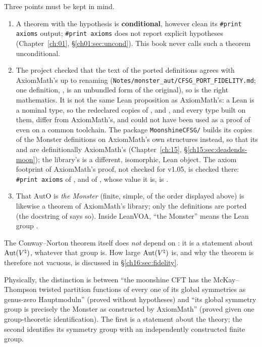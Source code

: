 Three points must be kept in mind.
\begin{enumerate}[label=(\alph*)]
\item A theorem with the hypothesis  is \textbf{conditional}, however clean its
  \texttt{\#print axioms} output; \texttt{\#print axioms} does not report explicit hypotheses
  (Chapter~\ref{ch:01}, \S\ref{ch01:sec:uncond}).  This book never calls such a theorem unconditional.
\item The project checked that the text of the ported definitions agrees with AxiomMath's up to renaming
  (\texttt{Notes/monster\_aut/CFSG\_PORT\_FIDELITY.md}; one definition, , is an unbundled
  form of the original), so  is the right mathematics.  It is not the same Lean proposition as
  AxiomMath's: a Lean  is a nominal type, so the redeclared copies of ,  and
  , and every type built on them, differ from AxiomMath's, and  could not have
  been used as a proof of  even on a common toolchain.  The package \texttt{MoonshineCFSG/} builds its
  copies of the Monster definitions on AxiomMath's own structures instead, so that its  and
   are definitionally AxiomMath's (Chapter~\ref{ch:15}, \S\ref{ch15:sec:deadends-moon}); the
  library's  is a different, isomorphic, Lean object.  The axiom footprint of AxiomMath's proof, not
  checked for v1.05, is checked there: \texttt{\#print axioms} of , and of ,
  whose value it is, is .
\item That $\mathrm{AutO}$ is \emph{the Monster} (finite, simple, of the order displayed above) is likewise a
  theorem of AxiomMath's library; only the definitions are ported (the docstring of
   says so).  Inside LeanVOA, ``the Monster'' means the Lean group
  .
\end{enumerate}
The Conway--Norton theorem  itself does \emph{not} depend on : it is a statement
about $\operatorname{Aut}({V^{\natural}})$, whatever that group is.  How large $\operatorname{Aut}({V^{\natural}})$ is, and why the theorem is therefore not
vacuous, is discussed in \S\ref{ch16:sec:fidelity}.

\begin{physics}
Physically, the distinction is between ``the moonshine CFT has the McKay--Thompson twisted partition functions of
every one of its global symmetries as genus-zero Hauptmoduln'' (proved without hypotheses) and ``its global symmetry
group is precisely the Monster as constructed by AxiomMath'' (proved given one group-theoretic identification).  The
first is a statement about the theory; the second identifies its symmetry group with an independently constructed
finite group.
\end{physics}

